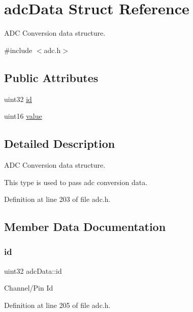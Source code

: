 \hypertarget{structadcData}{}\section{adc\+Data Struct Reference}
\label{structadcData}


A\+DC Conversion data structure.  




{\ttfamily \#include $<$adc.\+h$>$}

\subsection*{Public Attributes}
\begin{DoxyCompactItemize}
\item 
uint32 \mbox{\hyperlink{structadcData_a17b43632d28d8a5d79a0837796d92790}{id}}
\item 
uint16 \mbox{\hyperlink{structadcData_a90ab6176c797b3294127cfc83d72b4db}{value}}
\end{DoxyCompactItemize}


\subsection{Detailed Description}
A\+DC Conversion data structure. 

This type is used to pass adc conversion data. 

Definition at line 203 of file adc.\+h.



\subsection{Member Data Documentation}
\mbox{\label{structadcData_a17b43632d28d8a5d79a0837796d92790}} 
\subsubsection{\texorpdfstring{id}{id}}
{\footnotesize\ttfamily uint32 adc\+Data\+::id}

Channel/\+Pin Id 

Definition at line 205 of file adc.\+h.

\mbox{\label{structadcData_a90ab6176c797b3294127cfc83d72b4db}} 
